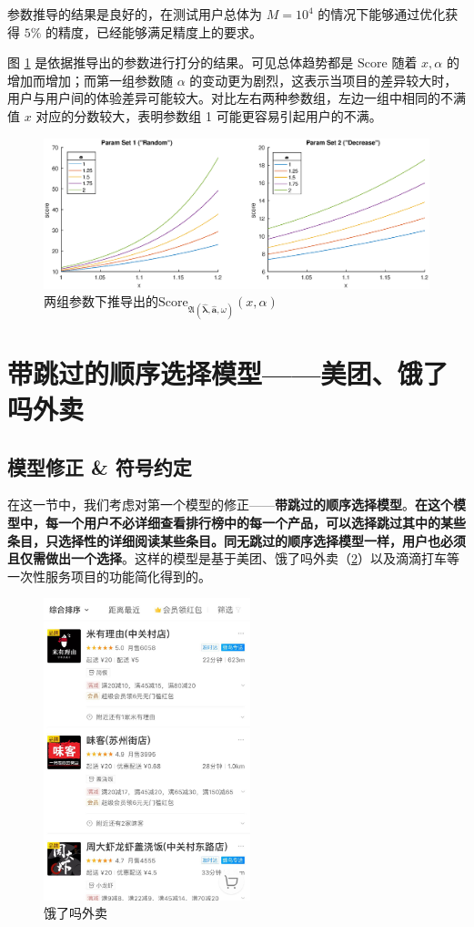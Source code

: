 \documentclass[UTF8]{ctexart}
\theoremstyle{plain}
\theoremstyle{definition}
\theoremstyle{remark}
\begin{document}
	参数推导的结果是良好的，在测试用户总体为 $M=10^4$ 的情况下能够通过优化获得 $5\%$ 的精度，已经能够满足精度上的要求。

	图 \ref{fig:random-decrease-score-compare-M-10000} 是依据推导出的参数进行打分的结果。可见总体趋势都是 $\text{Score}$ 随着 $x, \alpha$ 的增加而增加；而第一组参数随 $\alpha$ 的变动更为剧烈，这表示当项目的差异较大时，用户与用户间的体验差异可能较大。对比左右两种参数组，左边一组中相同的不满值 $x$ 对应的分数较大，表明参数组 1 可能更容易引起用户的不满。
	
	\begin{figure}[h!] 
		\centering
		\includegraphics[width = \linewidth]{../model/steam/pic/random-decrease-score-compare-M-10000.eps}
		\caption{两组参数下推导出的$\mathrm{Score}_{\mathfrak{A}\left(\bm{\hat{\lambda}}, \bm{\hat{a}}, \omega\right)}(x, \alpha)$}\label{fig:random-decrease-score-compare-M-10000}
	\end{figure}
	
	
	\section{带跳过的顺序选择模型——美团、饿了吗外卖}
	\subsection{模型修正 \& 符号约定}
	在这一节中，我们考虑对第一个模型的修正——\textbf{带跳过的顺序选择模型}。\textbf{在这个模型中，每一个用户不必详细查看排行榜中的每一个产品，可以选择跳过其中的某些条目，只选择性的详细阅读某些条目。同无跳过的顺序选择模型一样，用户也必须且仅需做出一个选择}。这样的模型是基于美团、饿了吗外卖（\ref{modelB_fig_1}）以及滴滴打车等一次性服务项目的功能简化得到的。
	\begin{figure}[h!] 
		\centering
		\includegraphics[width = 6cm]{modelB_fig_1.jpg}
		\caption{饿了吗外卖}\label{modelB_fig_1}
	\end{figure}
	
\end{document}
